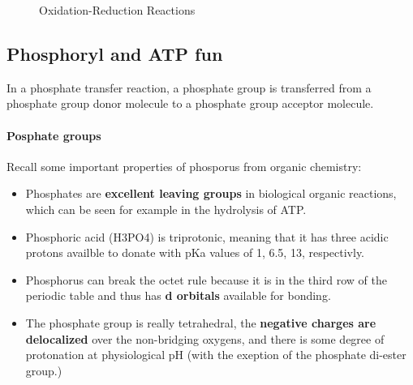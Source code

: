 \documentclass[../main.tex]{subfiles}
\begin{document}
\begin{figure}[h]
	\centering
	\hfill
	\caption{Oxidation-Reduction Reactions}
\end{figure}


\subsection{Phosphoryl and ATP fun}
In a phosphate transfer reaction, a phosphate group is transferred from a phosphate group donor molecule to a phosphate group acceptor molecule.
\paragraph{Posphate groups}
Recall some important properties of phosporus from organic chemistry: 
\begin{itemize}
	\item Phosphates are \textbf{excellent leaving groups} in biological organic reactions, which can be seen for example in the hydrolysis of ATP.
	\item Phosphoric acid (H3PO4) is triprotonic, meaning that it has three acidic protons availble to donate with pKa values of 1, 6.5, 13, respectivly.
	\item Phosphorus can break the octet rule because it is in the third row of the periodic table and thus has \textbf{d orbitals} available for bonding. 
	\item The phosphate group is really tetrahedral, the \textbf{negative charges are delocalized} over the non-bridging oxygens, and there is some degree of protonation at physiological pH (with the exeption of the phosphate di-ester group.)
\end{itemize}
\end{document}
